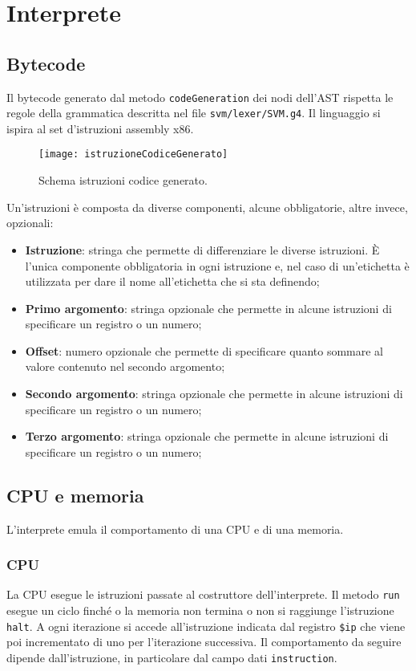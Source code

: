 \documentclass[../main.tex]{subfiles}
\begin{document}
\chapter{Interprete}\label{c:interprete}
\section{Bytecode}\label{s:bytecode}
Il bytecode generato dal metodo \verb|codeGeneration| dei nodi dell'AST rispetta le regole della grammatica descritta nel file \verb|svm/lexer/SVM.g4|. Il linguaggio si ispira al set d'istruzioni assembly x86. 
\begin{figure}[H]
    \centering
    \texttt{[image: istruzioneCodiceGenerato]}
    \caption{Schema istruzioni codice generato.}
    \label{fig:istruzione-codice-generato}
\end{figure}
Un'istruzioni \`e composta da diverse componenti, alcune obbligatorie, altre invece, opzionali:
\begin{itemize}
    \item \textbf{Istruzione}: stringa che permette di differenziare le diverse istruzioni. \`E l'unica componente obbligatoria in ogni istruzione e, nel caso di un'etichetta \`e utilizzata per dare il nome all'etichetta che si sta definendo;
    \item \textbf{Primo argomento}: stringa opzionale che permette in alcune istruzioni di specificare un registro o un numero;
    \item \textbf{Offset}: numero opzionale che permette di specificare quanto sommare al valore contenuto nel secondo argomento;
    \item \textbf{Secondo argomento}: stringa opzionale che permette in alcune istruzioni di specificare un registro o un numero;
    \item \textbf{Terzo argomento}: stringa opzionale che permette in alcune istruzioni di specificare un registro o un numero;
\end{itemize}
\section{CPU e memoria}\label{s:cpu-e-memoria}
L'interprete emula il comportamento di una CPU e di una memoria.
\subsection{CPU}
La CPU esegue le istruzioni passate al costruttore dell'interprete. Il metodo \verb|run| esegue un ciclo finch\'e o la memoria non termina o non si raggiunge l'istruzione \verb|halt|. A ogni iterazione si accede all'istruzione indicata dal registro \verb|$ip| che viene poi incrementato di uno per l'iterazione successiva. Il comportamento da seguire dipende dall'istruzione, in particolare dal campo dati \verb|instruction|.
\end{document}
